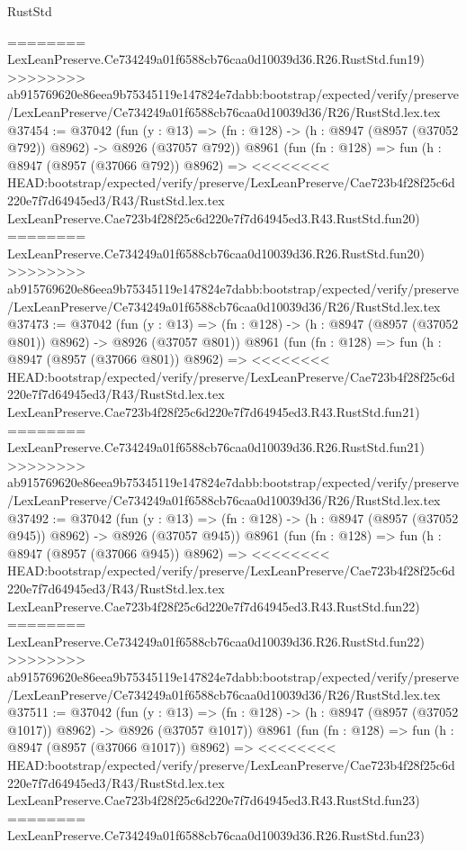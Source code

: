 \begin{lexlean}{RustStd}
\begin{coremodule}
{\begin{coremodule}
{{{{{{{{{{{{{{{{{{{{{{{{{{{{{{{{{{{{{{{========
    LexLeanPreserve.Ce734249a01f6588cb76caa0d10039d36.R26.RustStd.fun19)
>>>>>>>> ab915769620e86eea9b75345119e147824e7dabb:bootstrap/expected/verify/preserve/LexLeanPreserve/Ce734249a01f6588cb76caa0d10039d36/R26/RustStd.lex.tex
@37454 := @37042
    (fun (y : @13) => (fn : @128) -> (h : @8947 (@8957 (@37052 @792)) @8962) -> @8926 (@37057 @792))
    @8961
    (fun (fn : @128) =>
    fun (h : @8947 (@8957 (@37066 @792)) @8962) =>
<<<<<<<< HEAD:bootstrap/expected/verify/preserve/LexLeanPreserve/Cae723b4f28f25c6d220e7f7d64945ed3/R43/RustStd.lex.tex
    LexLeanPreserve.Cae723b4f28f25c6d220e7f7d64945ed3.R43.RustStd.fun20)
========
    LexLeanPreserve.Ce734249a01f6588cb76caa0d10039d36.R26.RustStd.fun20)
>>>>>>>> ab915769620e86eea9b75345119e147824e7dabb:bootstrap/expected/verify/preserve/LexLeanPreserve/Ce734249a01f6588cb76caa0d10039d36/R26/RustStd.lex.tex
@37473 := @37042
    (fun (y : @13) => (fn : @128) -> (h : @8947 (@8957 (@37052 @801)) @8962) -> @8926 (@37057 @801))
    @8961
    (fun (fn : @128) =>
    fun (h : @8947 (@8957 (@37066 @801)) @8962) =>
<<<<<<<< HEAD:bootstrap/expected/verify/preserve/LexLeanPreserve/Cae723b4f28f25c6d220e7f7d64945ed3/R43/RustStd.lex.tex
    LexLeanPreserve.Cae723b4f28f25c6d220e7f7d64945ed3.R43.RustStd.fun21)
========
    LexLeanPreserve.Ce734249a01f6588cb76caa0d10039d36.R26.RustStd.fun21)
>>>>>>>> ab915769620e86eea9b75345119e147824e7dabb:bootstrap/expected/verify/preserve/LexLeanPreserve/Ce734249a01f6588cb76caa0d10039d36/R26/RustStd.lex.tex
@37492 := @37042
    (fun (y : @13) => (fn : @128) -> (h : @8947 (@8957 (@37052 @945)) @8962) -> @8926 (@37057 @945))
    @8961
    (fun (fn : @128) =>
    fun (h : @8947 (@8957 (@37066 @945)) @8962) =>
<<<<<<<< HEAD:bootstrap/expected/verify/preserve/LexLeanPreserve/Cae723b4f28f25c6d220e7f7d64945ed3/R43/RustStd.lex.tex
    LexLeanPreserve.Cae723b4f28f25c6d220e7f7d64945ed3.R43.RustStd.fun22)
========
    LexLeanPreserve.Ce734249a01f6588cb76caa0d10039d36.R26.RustStd.fun22)
>>>>>>>> ab915769620e86eea9b75345119e147824e7dabb:bootstrap/expected/verify/preserve/LexLeanPreserve/Ce734249a01f6588cb76caa0d10039d36/R26/RustStd.lex.tex
@37511 := @37042
    (fun (y : @13) =>
    (fn : @128) -> (h : @8947 (@8957 (@37052 @1017)) @8962) -> @8926 (@37057 @1017))
    @8961
    (fun (fn : @128) =>
    fun (h : @8947 (@8957 (@37066 @1017)) @8962) =>
<<<<<<<< HEAD:bootstrap/expected/verify/preserve/LexLeanPreserve/Cae723b4f28f25c6d220e7f7d64945ed3/R43/RustStd.lex.tex
    LexLeanPreserve.Cae723b4f28f25c6d220e7f7d64945ed3.R43.RustStd.fun23)
========
    LexLeanPreserve.Ce734249a01f6588cb76caa0d10039d36.R26.RustStd.fun23)
}}}}}}}}}}}}}}}}}}}}}}}}}}}}}}}}}}}}}}}
\end{coremodule}}
\end{coremodule}
\end{lexlean}
